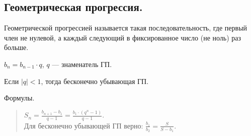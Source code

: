 \documentclass[12pt]{article}
\begin{document}
	\subsection{Геометрическая прогрессия.}
	\begin{definition}
		Геометрической прогрессией называется такая последовательность, где первый член не нулевой, а каждый следующий в фиксированное число (не ноль) раз больше.
	\end{definition}
	\begin{definition}
		$b_n = b_{n - 1} \cdot q$, $q$ --- знаменатель ГП.
	\end{definition}
	\begin{definition}
		Если $|q| < 1$, тогда бесконечно убывающая ГП.
	\end{definition}
	\begin{statement}
		Формулы.
		\begin{quote}
			$S_n = \frac{b_{n + 1} - b_1}{q - 1} = \frac{b_1 \cdot (q^n - 1)}{q - 1}$. \\
			Для бесконечно убывающей ГП верно: $\frac{b_1}{b_2} = \frac{S}{S - b_1}$.
		\end{quote}
	\end{statement}
\end{document}
